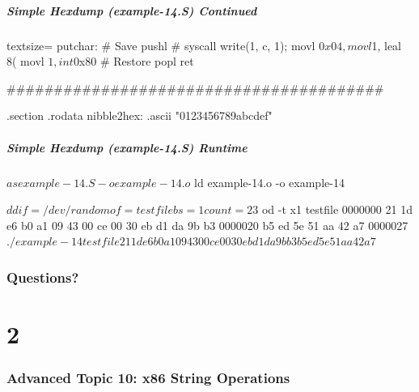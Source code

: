 \documentclass[11pt,xcolor=dvipsnames]{beamer}
\newcommand{\mvs}{\vspace{-0.95em}}
\begin{document}
\begin{frame}[fragile,t]
\mvs
\frametitle{Simple Hexdump (example-14.S) Continued}
\begin{gascode*}{textsize=}
putchar:
    # Save %
    pushl %
    # syscall write(1, c, 1);
    movl $0x04, %
    movl $1, %
    leal 8(%
    movl $1, %
    int $0x80
    # Restore %
    popl %
    ret

########################################

.section .rodata
nibble2hex: .ascii "0123456789abcdef"
\end{gascode*}
\end{frame}

\begin{frame}[fragile,t]
\mvs
\frametitle{Simple Hexdump (example-14.S) Runtime}
\begin{textcode}
$ as example-14.S -o example-14.o
$ ld example-14.o -o example-14

$ dd if=/dev/random of=testfile bs=1 count=23
$ od -t x1 testfile
0000000 21 1d e6 b0 a1 09 43 00 ce 00 30 eb d1 da 9b b3
0000020 b5 ed 5e 51 aa 42 a7
0000027
$ ./example-14 testfile
21 1d e6 b0 a1 09 43 00 ce 00 30 eb d1 da 9b b3
b5 ed 5e 51 aa 42 a7
$
\end{textcode}
\end{frame}

\section*{Questions?}

\part{2}

\section{Advanced Topic 10: x86 String Operations}
\end{document}
